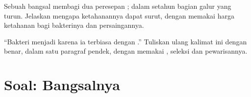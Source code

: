 \begin{exercise}[$\star\star\star$]\label{exo:g11:antibiotic-resistance:14}
Sebuah bangsal membagi dua peresepan ; dalam setahun
bagian galur yang  turun. Jelaskan mengapa ketahanannya dapat
surut, dengan memakai harga ketahanan bagi bakterinya dan persaingannya.
\end{exercise}

\begin{exercise}[$\star\star\star$]\label{exo:g11:antibiotic-resistance:15}
``Bakteri menjadi  karena ia terbiasa dengan .''
Tuliskan ulang kalimat ini dengan benar, dalam satu paragraf pendek,
dengan memakai , seleksi dan pewarisannya.
\end{exercise}

\section{Soal: Bangsalnya}

